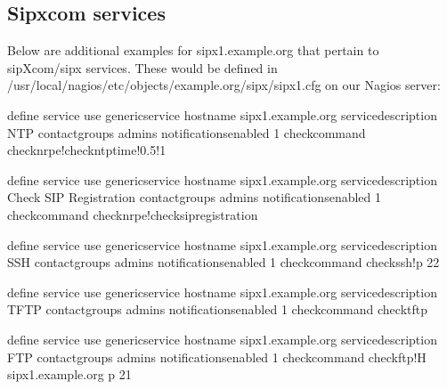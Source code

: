 \documentclass[letterpaper,10pt,english]{sphinxmanual}
\begin{document}
\subsection{Sipxcom services}
\label{\detokenize{monitoring:sipxcom-services}}
Below are additional examples for sipx1.example.org that pertain to sipXcom/sipx services. These would be defined in /usr/local/nagios/etc/objects/example.org/sipx/sipx1.cfg on our Nagios server:

\begin{sphinxVerbatim}[commandchars=\\\{\}]
define service\PYGZob{}
        use                             generic\PYGZhy{}service
        host\PYGZus{}name                       sipx1.example.org
        service\PYGZus{}description             NTP
        contact\PYGZus{}groups                  admins
        notifications\PYGZus{}enabled           1
        check\PYGZus{}command                   check\PYGZus{}nrpe!check\PYGZus{}ntp\PYGZus{}time!0.5!1
        \PYGZcb{}

define service\PYGZob{}
        use                             generic\PYGZhy{}service
        host\PYGZus{}name                       sipx1.example.org
        service\PYGZus{}description             Check SIP Registration
        contact\PYGZus{}groups                  admins
        notifications\PYGZus{}enabled           1
        check\PYGZus{}command                   check\PYGZus{}nrpe!check\PYGZus{}sip\PYGZus{}registration
        \PYGZcb{}

define service\PYGZob{}
        use                             generic\PYGZhy{}service
        host\PYGZus{}name                       sipx1.example.org
        service\PYGZus{}description             SSH
        contact\PYGZus{}groups                  admins
        notifications\PYGZus{}enabled           1
        check\PYGZus{}command                   check\PYGZus{}ssh!\PYGZhy{}p 22
        \PYGZcb{}

define service\PYGZob{}
        use                             generic\PYGZhy{}service
        host\PYGZus{}name                       sipx1.example.org
        service\PYGZus{}description             TFTP
        contact\PYGZus{}groups                  admins
        notifications\PYGZus{}enabled           1
        check\PYGZus{}command                   check\PYGZus{}tftp
        \PYGZcb{}

define service\PYGZob{}
        use                             generic\PYGZhy{}service
        host\PYGZus{}name                       sipx1.example.org
        service\PYGZus{}description             FTP
        contact\PYGZus{}groups                  admins
        notifications\PYGZus{}enabled           1
        check\PYGZus{}command                   check\PYGZus{}ftp!\PYGZhy{}H sipx1.example.org \PYGZhy{}p 21
        \PYGZcb{}


\end{sphinxVerbatim}
\end{document}
